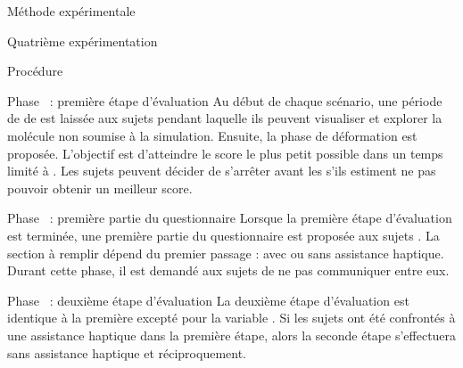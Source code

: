 \documentclass[myfrancais,ngerman,english,french]{mythesis}
\begin{document}
\begin{mychapter}{Méthode expérimentale}
\begin{mysection}{Quatrième expérimentation}
\begin{mysubsection}{Procédure}
\begin{myparagraph}{Phase~ : première étape d'évaluation}
					Au début de chaque scénario, une période de  de \mybrainstorming est laissée aux sujets pendant laquelle ils peuvent visualiser et explorer la molécule non soumise à la simulation.
					Ensuite, la phase de déformation est proposée.
					L'objectif est d'atteindre le score  le plus petit possible dans un temps limité à .
					Les sujets peuvent décider de s'arrêter avant les  s'ils estiment ne pas pouvoir obtenir un meilleur score.
				\end{myparagraph}
				\begin{myparagraph}{Phase~ : première partie du questionnaire}
					Lorsque la première étape d'évaluation est terminée, une première partie du questionnaire est proposée aux sujets .
					La section à remplir dépend du premier passage : avec ou sans assistance haptique.
					Durant cette phase, il est demandé aux sujets de ne pas communiquer entre eux.
				\end{myparagraph}
				\begin{myparagraph}{Phase~ : deuxième étape d'évaluation}
					La deuxième étape d'évaluation est identique à la première excepté pour la variable .
					Si les sujets ont été confrontés à une assistance haptique dans la première étape, alors la seconde étape s'effectuera sans assistance haptique et réciproquement.


\end{myparagraph}
\end{mysubsection}
\end{mysection}
\end{mychapter}
\end{document}
